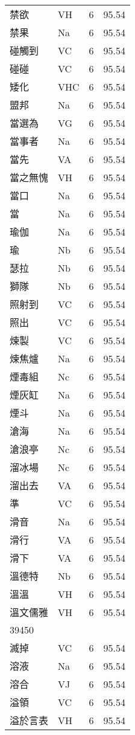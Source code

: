 \documentclass[twocolumn]{book}
\begin{document}
\begin{supertabular}{llrr}
禁欲 & VH & 6 &  95.54\\
禁果 & Na & 6 &  95.54\\
碰觸到 & VC & 6 &  95.54\\
碰碰 & VC & 6 &  95.54\\
矮化 & VHC & 6 &  95.54\\
盟邦 & Na & 6 &  95.54\\
當選為 & VG & 6 &  95.54\\
當事者 & Na & 6 &  95.54\\
當先 & VA & 6 &  95.54\\
當之無愧 & VH & 6 &  95.54\\
當口 & Na & 6 &  95.54\\
當 & Na & 6 &  95.54\\
瑜伽 & Na & 6 &  95.54\\
瑜 & Nb & 6 &  95.54\\
瑟拉 & Nb & 6 &  95.54\\
獅隊 & Nb & 6 &  95.54\\
照射到 & VC & 6 &  95.54\\
照出 & VC & 6 &  95.54\\
煉製 & VC & 6 &  95.54\\
煉焦爐 & Na & 6 &  95.54\\
煙毒組 & Nc & 6 &  95.54\\
煙灰缸 & Na & 6 &  95.54\\
煙斗 & Na & 6 &  95.54\\
滄海 & Na & 6 &  95.54\\
滄浪亭 & Nc & 6 &  95.54\\
溜冰場 & Nc & 6 &  95.54\\
溜出去 & VA & 6 &  95.54\\
準 & VC & 6 &  95.54\\
滑音 & Na & 6 &  95.54\\
滑行 & VA & 6 &  95.54\\
滑下 & VA & 6 &  95.54\\
溫德特 & Nb & 6 &  95.54\\
溫溫 & VH & 6 &  95.54\\
溫文儒雅 & VH & 6 &  95.54\\
39450\\
滅掉 & VC & 6 &  95.54\\
溶液 & Na & 6 &  95.54\\
溶合 & VJ & 6 &  95.54\\
溢領 & VC & 6 &  95.54\\
溢於言表 & VH & 6 &  95.54\\

\end{supertabular}
\end{document}

